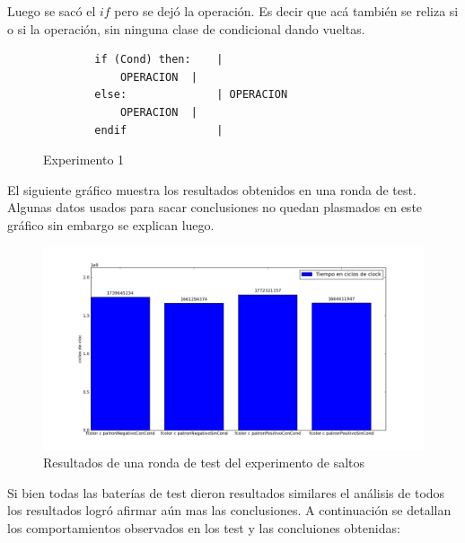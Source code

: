 	Luego se sacó el $if$ pero se dejó la operación. Es decir que acá
también se reliza si o si la operación, sin ninguna clase de condicional
dando vueltas.


\begin{figure}[h]
	\begin{mdframed}
	\begin{center}
		\begin{lstlisting}
		if (Cond) then:    | 
			OPERACION  | 
		else:              | OPERACION
			OPERACION  |
		endif              |
		\end{lstlisting}
	\end{center}
	\end{mdframed}
	\caption{Experimento 1}
	\label{fig:Experimento Saltos}
\end{figure}

	El siguiente gráfico muestra los resultados obtenidos en una ronda de test.
Algunas datos usados para sacar conclusiones no quedan plasmados en este gráfico sin
embargo se explican luego.

\begin{figure}[H]
\begin{center}
  \includegraphics[scale=0.5]{secciones/filtro_color/graficos/performanceExpSaltos.png}
\end{center}
\caption{Resultados de una ronda de test del experimento de saltos}
\label{fig: Tiempos Experimento Saltos}
\end{figure}

	Si bien todas las baterías de test dieron resultados similares el análisis de todos
los resultados logró afirmar aún mas las conclusiones. A continuación
se detallan los comportamientos observados en los test y las concluiones obtenidas:


